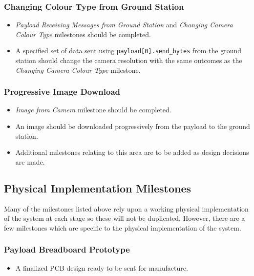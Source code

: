 	\subsubsection{Changing Colour Type from Ground Station}
		\begin{itemize}
			\item 	\emph{Payload Receiving Messages from Ground Station} and 
				\emph{Changing Camera Colour Type} milestones should be completed.
			\item 	A specified set of data sent using \verb+payload[0].send_bytes+
				from the ground station should change the camera resolution with 
				the same outcomes as the \emph{Changing Camera Colour Type} milestone.
		\end{itemize}

	\subsubsection{Progressive Image Download}
		\begin{itemize}
			\item 	\emph{Image from Camera} milestone should be completed.
			\item 	An image should be downloaded progressively from the payload to the
				ground station.
			\item 	Additional milestones relating to this area are to be added as design decisions
				are made.
		\end{itemize}

\subsection{Physical Implementation Milestones}
Many of the milestones listed above rely upon a working physical implementation of the system at each stage
so these will not be duplicated. However, there are a few milestones which are specific to the physical implementation
of the system.



	\subsubsection{Payload Breadboard Prototype}
		\begin{itemize}
			\item A finalized PCB design ready to be sent for manufacture. 
		\end{itemize}

